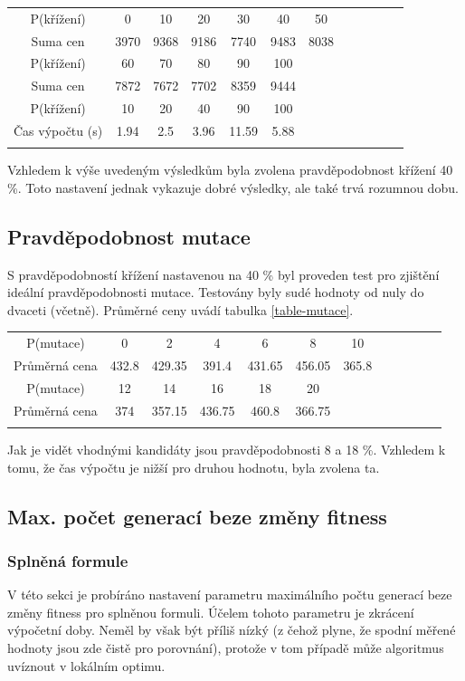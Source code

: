 \documentclass[a4paper]{article}
\begin{document}
		\begin{tabular}{cccccccccccc} \label{table-krizeni}
		\\
		P(křížení) & 0 & 10 & 20 & 30 & 40 & 50 \\
		Suma cen & 3970	 & 9368 & 9186 & 7740 & 9483 & 8038 \\
		\hline
		P(křížení) & 60 & 70 & 80 & 90 & 100 \\
		Suma cen & 7872 & 7672 & 7702 & 8359 & 9444 \\
		\hline
		P(křížení) & 10 & 20 & 40 & 90 & 100\\
		Čas výpočtu (s) & 1.94 & 2.5 & 3.96 & 11.59 & 5.88\\
		\\
		\end{tabular}
		
		Vzhledem k výše uvedeným výsledkům byla zvolena pravděpodobnost křížení 40 \%. Toto nastavení jednak vykazuje dobré výsledky, ale také trvá rozumnou dobu.
	
	\subsection{Pravděpodobnost mutace}
		S pravděpodobností křížení nastavenou na 40 \% byl proveden test pro zjištění ideální pravděpodobnosti mutace. Testovány byly sudé hodnoty od nuly do dvaceti (včetně). Průměrné ceny uvádí tabulka \ref{table-mutace}.
		
		\begin{tabular}{cccccccccccc} \label{table-mutace}
		\\
		P(mutace) & 0 & 2 & 4 & 6 & 8 & 10 \\
		Průměrná cena & 432.8 & 429.35 & 391.4 & 431.65 & 456.05 & 365.8\\
		\hline
		P(mutace) & 12 & 14 & 16 & 18 & 20 \\
		Průměrná cena & 374 & 357.15 & 436.75	 & 460.8 & 366.75 \\
		\\
		\end{tabular}
		
		Jak je vidět vhodnými kandidáty jsou pravděpodobnosti 8 a 18 \%. Vzhledem k tomu, že čas výpočtu je nižší pro druhou hodnotu, byla zvolena ta.
	
	\subsection{Max. počet generací beze změny fitness}
		\subsubsection{Splněná formule}
			V této sekci je probíráno nastavení parametru maximálního počtu generací beze změny fitness pro splněnou formuli. Účelem tohoto parametru je zkrácení výpočetní doby. Neměl by však být příliš nízký (z čehož plyne, že spodní měřené hodnoty jsou zde čistě pro porovnání), protože v tom případě může algoritmus uvíznout v lokálním optimu.
			
\end{document}
